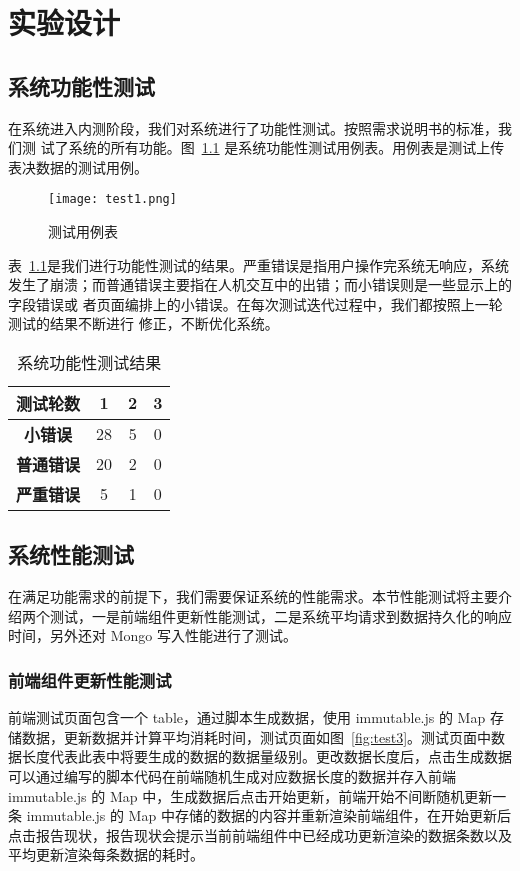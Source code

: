 
\chapter{实验设计}

\section{系统功能性测试}
在系统进入内测阶段，我们对系统进行了功能性测试。按照需求说明书的标准，我们测
试了系统的所有功能。图~\ref{fig:test1} 是系统功能性测试用例表。用例表是测试上传表决数据的测试用例。

\begin{figure}[!htp]
    \centering
    \texttt{[image: test1.png]}
    \caption{测试用例表}
    \label{fig:test1}
  \end{figure}

  表~\ref{fig:test2}是我们进行功能性测试的结果。严重错误是指用户操作完系统无响应，系统发生了崩溃；而普通错误主要指在人机交互中的出错；而小错误则是一些显示上的字段错误或
  者页面编排上的小错误。在每次测试迭代过程中，我们都按照上一轮测试的结果不断进行
  修正，不断优化系统。

  \begin{table}[h!]
    \begin{center}
      \caption{系统功能性测试结果}
      \label{fig:test2}
      \begin{tabular}{ c c c c }
        \hline
        \textbf{测试轮数} & 1 & 2 & 3 \\
        \hline
        \textbf{小错误} & 28 & 5 & 0 \\
        \textbf{普通错误} & 20 & 2 & 0 \\
        \textbf{严重错误} & 5 & 1 & 0 \\
        \hline
      \end{tabular}
    \end{center}
  \end{table}

\section{系统性能测试}
在满足功能需求的前提下，我们需要保证系统的性能需求。本节性能测试将主要介绍两个测试，一是前端组件更新性能测试，二是系统平均请求到数据持久化的响应时间，另外还对 Mongo 写入性能进行了测试。

\subsection{前端组件更新性能测试}
前端测试页面包含一个 table，通过脚本生成数据，使用 immutable.js 的 Map 存储数据，更新数据并计算平均消耗时间，测试页面如图~\ref{fig:test3}。测试页面中数据长度代表此表中将要生成的数据的数据量级别。更改数据长度后，点击生成数据可以通过编写的脚本代码在前端随机生成对应数据长度的数据并存入前端 immutable.js 的 Map 中，生成数据后点击开始更新，前端开始不间断随机更新一条 immutable.js 的 Map 中存储的数据的内容并重新渲染前端组件，在开始更新后点击报告现状，报告现状会提示当前前端组件中已经成功更新渲染的数据条数以及平均更新渲染每条数据的耗时。

